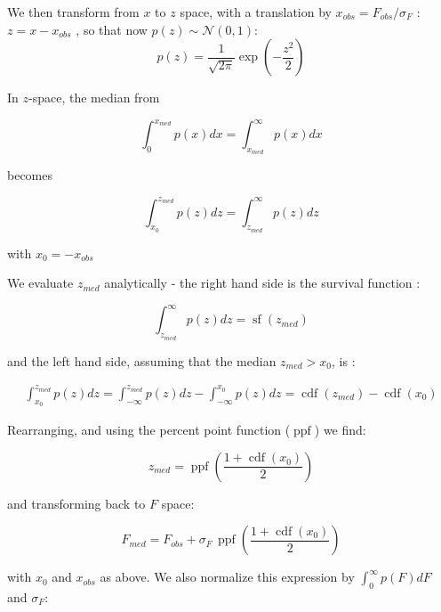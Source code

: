 \documentclass[fleqn,usenatbib]{mnras}  %
\DeclareMathOperator\cdf{cdf}
\DeclareMathOperator\sf{sf}
\DeclareMathOperator\ppf{ppf}
\begin{document}
We  then transform from $x$ to $z$ space, with  a translation by $x_{obs} = F_{obs} / \sigma_{F}$ :  $z = x - x_{obs}$  , so that now  $p(z) \sim \mathcal{N}(0,1)$:
\begin{equation}
p(z) = \frac{1}{\sqrt{2  \pi }} \exp{ \left(-\frac{z^2}{2}\right)}
\end{equation}



In $z$-space, the median from 

\begin{equation}
\int_{0}^{x_{med}} {p(x)dx} = \int_{x_{med}}^{\infty} {p(x)dx}
\end{equation}
 
becomes 

\begin{equation}
\int_{x_{0}}^{z_{med}}{p(z)dz} = \int_{z_{med}}^{\infty}{p(z)dz}
\end{equation}

with  $x_{0}=-x_{obs}$

\bigskip

We evaluate $z_{med}$ analytically  - the right hand side is the survival function  : 

\begin{equation}
\int_{z_{med}}^{\infty}{p(z)dz} = \sf(z_{med})
\end{equation}

and the left hand side, assuming that the median $z_{med} > x_{0}$, is :

\begin{multline}
\int_{x_{0}}^{z_{med}}{p(z)dz} = \int_{-\infty}^{z_{med}}{p(z)dz} - \int_{-\infty}^{x_{0}}{p(z)dz} = \cdf(z_{med}) - \cdf(x_{0})
\end{multline}

Rearranging, and using the percent point function ($\ppf$)  we find:

\begin{equation}
z_{med} = \ppf \left( \frac{1+\cdf(x_{0})}{2} \right)
\end{equation}

and transforming back to $F$ space: 

\begin{equation}
F_{med} = F_{obs} + \sigma_{F} \, \ppf \left( \frac{1+\cdf(x_{0})}{2} \right)
\end{equation}

with $x_{0}$ and $x_{obs}$ as above.  We also normalize this expression by $\int _{0} ^ {\infty}{ p(F) dF}$ and $\sigma_{F}$:
\end{document}
